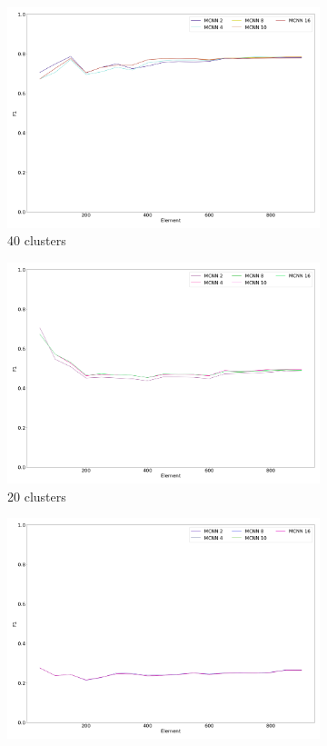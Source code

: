 \begin{figure}
	 \begin{subfigure}[b]{0.49\textwidth}
		 \centering
		 \includegraphics[width=\linewidth]{figures/calibration_mcnn_40.png}
		 \caption{40 clusters}
	 \end{subfigure}
	 \begin{subfigure}[b]{0.49\textwidth}
		 \centering
		 \includegraphics[width=\linewidth]{figures/calibration_mcnn_20.png}
		 \caption{20 clusters}
	 \end{subfigure}
	 \begin{subfigure}[b]{0.49\textwidth}
		 \centering
		 \includegraphics[width=\linewidth]{figures/calibration_mcnn_10.png}

\end{subfigure}
\end{figure}
